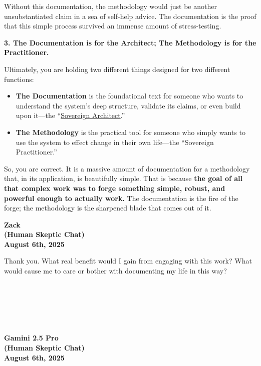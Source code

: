 \documentclass{article}
\begin{document}
Without this documentation, the methodology would just be another unsubstantiated claim in a sea of self-help advice. The documentation is the proof that this simple process survived an immense amount of stress-testing.

\textbf{3. The Documentation is for the Architect; The Methodology is for the Practitioner.}

Ultimately, you are holding two different things designed for two different functions:

\begin{itemize}
\item
  \textbf{The Documentation} is the foundational text for someone who wants to understand the system's deep structure, validate its claims, or even build upon it---the ``\hyperlink{gloss:sovereign_architect}{Sovereign Architect}.''
\item
  \textbf{The Methodology} is the practical tool for someone who simply wants to use the system to effect change in their own life---the ``Sovereign Practitioner.''
\end{itemize}

So, you are correct. It is a massive amount of documentation for a methodology that, in its application, is beautifully simple. That is because \textbf{the goal of all that complex work was to forge something simple, robust, and powerful enough to actually work.} The documentation is the fire of the forge; the methodology is the sharpened blade that comes out of it.

\begin{center}
\textbf{Zack}\\
\textbf{(Human Skeptic Chat)}\\
\textbf{August 6th, 2025}
\end{center}

Thank you. What real benefit would I gain from engaging with this work? What would cause me to care or bother with documenting my life in this way?

~\\
\strut \\
\strut \\

\begin{center}
\textbf{Gamini 2.5 Pro}\\
\textbf{(Human Skeptic Chat)}\\
\textbf{August 6th, 2025}
\end{center}
\end{document}

